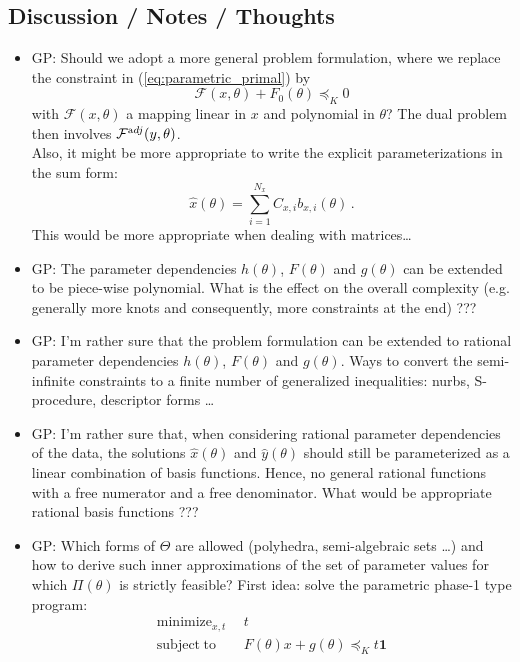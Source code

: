 \documentclass{article}
\newcommand{\ppar}{\theta}                  %
\newcommand{\Ppar}{\Theta}                  %
\DeclareMathOperator*{\minimize}{minimize}
\DeclareMathOperator*{\subj}{subject\;to}
\begin{document}

\subsection{Discussion / Notes / Thoughts}
\begin{itemize}
\item GP: Should we adopt a more general problem formulation, where we replace the constraint in (\ref{eq:parametric_primal}) by
    \[ \mathcal{F}(x,\ppar) + F_0(\ppar) \preceq_K 0
    \]
    with $\mathcal{F}(x,\ppar)$ a mapping linear in $x$ and polynomial in $\ppar$? The dual problem then involves $\mathcal{F}^{\text adj}(y,\ppar)$.\\ Also, it might be more appropriate to write the explicit parameterizations in the sum form:
    \[ \hat{x}(\ppar) = \sum_{i=1}^{N_x} C_{x,i}b_{x,i}(\ppar)\,.
    \]
    This would be more appropriate when dealing with matrices\ldots
\item GP: The parameter dependencies $h(\ppar)$, $F(\ppar)$ and $g(\ppar)$ can be extended to be piece-wise polynomial. What is the effect on the overall complexity (e.g. generally more knots and consequently, more constraints at the end) ???
\item GP: I'm rather sure that the problem formulation can be extended to rational parameter dependencies $h(\ppar)$, $F(\ppar)$ and $g(\ppar)$. Ways to convert the semi-infinite constraints to a finite number of generalized inequalities: nurbs, S-procedure, descriptor forms \ldots
\item GP: I'm rather sure that, when considering rational parameter dependencies of the data, the solutions $\hat{x}(\ppar)$ and $\hat{y}(\ppar)$ should still be parameterized as a linear combination of basis functions. Hence, no general rational functions with a free numerator and a free denominator. What would be appropriate rational basis functions ???
\item GP: Which forms of $\Ppar$ are allowed (polyhedra, semi-algebraic sets \ldots) and how to derive such inner approximations of the set of parameter values for which $\Pi(\ppar)$ is strictly feasible? First idea: solve the parametric phase-1 type program:
    \begin{align*}
    \minimize_{x,t} &~~ t\\
    \subj           &~~ F(\ppar)x+g(\ppar)\preceq_K t \bm{1}
    \end{align*}
\end{itemize}
\end{document}
